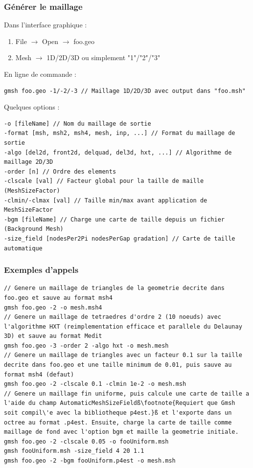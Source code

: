 \documentclass[aspectratio=169]{beamer}
\begin{document}
\begin{frame}[fragile]
\frametitle{Générer le maillage}
Dans l'interface graphique :
\begin{enumerate}
  \item File $\rightarrow$ Open $\rightarrow$ foo.geo
  \item Mesh $\rightarrow$ 1D/2D/3D ou simplement "1"/"2"/"3"
\end{enumerate}
En ligne de commande :
\begin{lstlisting}[frame=none, aboveskip=1mm, belowskip=0mm]
gmsh foo.geo -1/-2/-3 // Maillage 1D/2D/3D avec output dans "foo.msh"
\end{lstlisting}
Quelques options :
\begin{lstlisting}[frame=non,aboveskip=1mm,belowskip=0.5mm]
-o [fileName] // Nom du maillage de sortie
-format [msh, msh2, msh4, mesh, inp, ...] // Format du maillage de sortie
-algo [del2d, front2d, delquad, del3d, hxt, ...] // Algorithme de maillage 2D/3D
-order [n] // Ordre des elements
-clscale [val] // Facteur global pour la taille de maille (MeshSizeFactor)
-clmin/-clmax [val] // Taille min/max avant application de MeshSizeFactor
-bgm [fileName] // Charge une carte de taille depuis un fichier (Background Mesh)
-size_field [nodesPer2Pi nodesPerGap gradation] // Carte de taille automatique
\end{lstlisting}
\end{frame}

\begin{frame}[fragile]
\frametitle{Exemples d'appels}
\begin{lstlisting}[frame=none, aboveskip=1mm, belowskip=2mm, escapechar=ß]
// Genere un maillage de triangles de la geometrie decrite dans foo.geo et sauve au format msh4
gmsh foo.geo -2 -o mesh.msh4
// Genere un maillage de tetraedres d'ordre 2 (10 noeuds) avec l'algorithme HXT (reimplementation efficace et parallele du Delaunay 3D) et sauve au format Medit
gmsh foo.geo -3 -order 2 -algo hxt -o mesh.mesh
// Genere un maillage de triangles avec un facteur 0.1 sur la taille decrite dans foo.geo et une taille minimum de 0.01, puis sauve au format msh4 (defaut)
gmsh foo.geo -2 -clscale 0.1 -clmin 1e-2 -o mesh.msh
// Genere un maillage fin uniforme, puis calcule une carte de taille a l'aide du champ AutomaticMeshSizeFieldß\footnote{Requiert que Gmsh soit compil\'e avec la bibliotheque p4est.}ß et l'exporte dans un octree au format .p4est. Ensuite, charge la carte de taille comme maillage de fond avec l'option bgm et maille la geometrie initiale.
gmsh foo.geo -2 -clscale 0.05 -o fooUniform.msh
gmsh fooUniform.msh -size_field 4 20 1.1
gmsh foo.geo -2 -bgm fooUniform.p4est -o mesh.msh
\end{lstlisting}
\end{frame}
\end{document}
